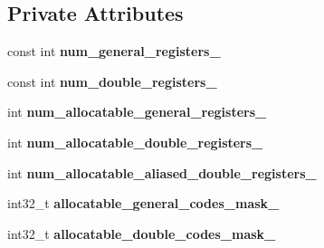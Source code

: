 \subsection*{Private Attributes}
\begin{DoxyCompactItemize}
\item 
const int {\bfseries num\+\_\+general\+\_\+registers\+\_\+}\hypertarget{classv8_1_1internal_1_1_register_configuration_a95136b77878772fda354d7ef36cd7da6}{}\label{classv8_1_1internal_1_1_register_configuration_a95136b77878772fda354d7ef36cd7da6}

\item 
const int {\bfseries num\+\_\+double\+\_\+registers\+\_\+}\hypertarget{classv8_1_1internal_1_1_register_configuration_a8207f160c9142b8d4cb3ab8908743a10}{}\label{classv8_1_1internal_1_1_register_configuration_a8207f160c9142b8d4cb3ab8908743a10}

\item 
int {\bfseries num\+\_\+allocatable\+\_\+general\+\_\+registers\+\_\+}\hypertarget{classv8_1_1internal_1_1_register_configuration_a8d4658c4ccc498b90ad8e6519f1c29bc}{}\label{classv8_1_1internal_1_1_register_configuration_a8d4658c4ccc498b90ad8e6519f1c29bc}

\item 
int {\bfseries num\+\_\+allocatable\+\_\+double\+\_\+registers\+\_\+}\hypertarget{classv8_1_1internal_1_1_register_configuration_a9617f1dd508c3bf1dbd75384ab06ce03}{}\label{classv8_1_1internal_1_1_register_configuration_a9617f1dd508c3bf1dbd75384ab06ce03}

\item 
int {\bfseries num\+\_\+allocatable\+\_\+aliased\+\_\+double\+\_\+registers\+\_\+}\hypertarget{classv8_1_1internal_1_1_register_configuration_a282119f76c21af48fe2e9c9da6e1baee}{}\label{classv8_1_1internal_1_1_register_configuration_a282119f76c21af48fe2e9c9da6e1baee}

\item 
int32\+\_\+t {\bfseries allocatable\+\_\+general\+\_\+codes\+\_\+mask\+\_\+}\hypertarget{classv8_1_1internal_1_1_register_configuration_af2f80833a99ec265903340a2ce1d579e}{}\label{classv8_1_1internal_1_1_register_configuration_af2f80833a99ec265903340a2ce1d579e}

\item 
int32\+\_\+t {\bfseries allocatable\+\_\+double\+\_\+codes\+\_\+mask\+\_\+}\hypertarget{classv8_1_1internal_1_1_register_configuration_a61e42b82e24f02a2bd33f4e1cb9ba57e}{}\label{classv8_1_1internal_1_1_register_configuration_a61e42b82e24f02a2bd33f4e1cb9ba57e}


\end{DoxyCompactItemize}

